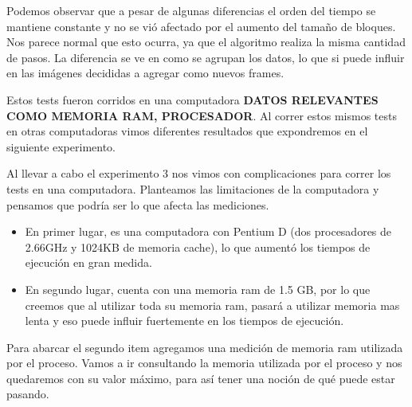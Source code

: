 \begin{figure}[ht]
	\begin{center}
	\end{center}
\end{figure}
\par Podemos observar que a pesar de algunas diferencias el orden del tiempo se mantiene constante y no se vi\'o afectado por el aumento del tama\~no de bloques. Nos parece normal que esto ocurra, ya que el algoritmo realiza la misma cantidad de pasos. La diferencia se ve en como se agrupan los datos, lo que si puede influir en las im\'agenes decididas a agregar como nuevos frames.
\par Estos tests fueron corridos en una computadora \textbf{DATOS RELEVANTES COMO MEMORIA RAM, PROCESADOR}. Al correr estos mismos tests en otras computadoras vimos diferentes resultados que expondremos en el siguiente experimento.

\par Al llevar a cabo el experimento 3 nos vimos con complicaciones para correr los tests en una computadora. Planteamos las limitaciones de la computadora y pensamos que podr\'ia ser lo que afecta las mediciones.
\begin{itemize}
	\item En primer lugar, es una computadora con Pentium D (dos procesadores de 2.66GHz y 1024KB de memoria cache), lo que aument\'o los tiempos de ejecuci\'on en gran medida.
	\item En segundo lugar, cuenta con una memoria ram de 1.5 GB, por lo que creemos que al utilizar toda su memoria ram, pasar\'a a utilizar memoria mas lenta y eso puede influir fuertemente en los tiempos de ejecuci\'on.
\end{itemize}
\par Para abarcar el segundo item agregamos una medici\'on de memoria ram utilizada por el proceso. Vamos a ir consultando la memoria utilizada por el proceso y nos quedaremos con su valor m\'aximo, para as\'i tener una noci\'on de qu\'e puede estar pasando.

